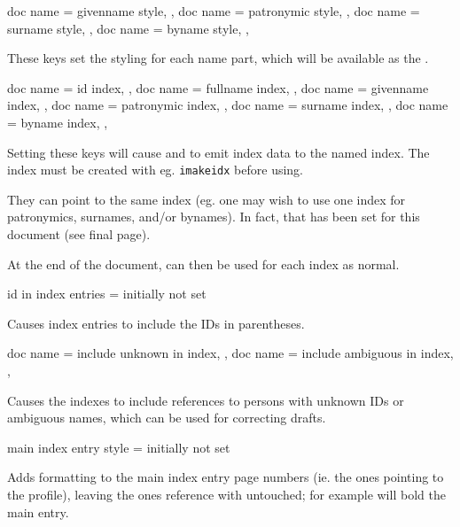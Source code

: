 \documentclass[
	a4paper,
]{article}
\begin{document}
\begin{docKeys}
	[
		doc parameter = {=\meta{...}},
		doc description = {initially not set},
	]
	{
		{
			doc name = givenname style,
		},
		{
			doc name = patronymic style,
		},
		{
			doc name = surname style,
		},
		{
			doc name = byname style,
		},
	}

	These keys set the styling for each name part, which will be available as the .

\end{docKeys}

\begin{docKeys}
	[
		doc parameter = {=\meta{...}},
		doc description = {initially not set},
	]
	{
		{
			doc name = id index,
		},
		{
			doc name = fullname index,
		},
		{
			doc name = givenname index,
		},
		{
			doc name = patronymic index,
		},
		{
			doc name = surname index,
		},
		{
			doc name = byname index,
		},
	}

	Setting these keys will cause  and  to emit index data to the named index. The index must be created with eg. \texttt{imakeidx} before using.

	They can point to the same index (eg. one may wish to use one index for patronymics, surnames, and/or bynames). In fact, that has been set for this document (see final page).

	At the end of the document,  can then be used for each index as normal.

\end{docKeys}

\begin{docKey}
	{id in index entries}
	{=}
	{initially not set}

	Causes index entries to include the IDs in parentheses.
\end{docKey}

\begin{docKeys}
	[
		doc parameter = {=\meta{true/false}},
		doc description = {initially not set},
	]
	{
		{
			doc name = include unknown in index,
		},
		{
			doc name = include ambiguous in index,
		},
	}

	Causes the indexes to include references to persons with unknown IDs or ambiguous names, which can be used for correcting drafts.

\end{docKeys}

\begin{docKey}
	{main index entry style}
	{=}
	{initially not set}

	Adds formatting to the main index entry page numbers (ie. the ones pointing to the profile), leaving the ones reference with  untouched; for example  will bold the main entry.
\end{docKey}
\end{document}

